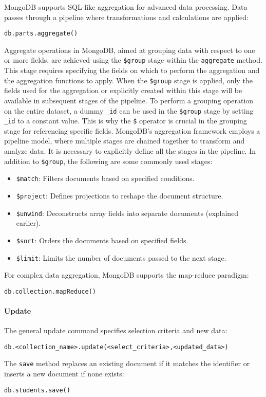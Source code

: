 MongoDB supports SQL-like aggregation for advanced data processing. 
Data passes through a pipeline where transformations and calculations are applied:
\begin{lstlisting}[style=MongoDB]
db.parts.aggregate()
\end{lstlisting}
Aggregate operations in MongoDB, aimed at grouping data with respect to one or more fields, are achieved using the \texttt{\$group} stage within the \texttt{aggregate} method.
This stage requires specifying the fields on which to perform the aggregation and the aggregation functions to apply. 
When the \texttt{\$group} stage is applied, only the fields used for the aggregation or explicitly created within this stage will be available in subsequent stages of the pipeline. 
To perform a grouping operation on the entire dataset, a dummy \texttt{\_id} can be used in the \texttt{\$group} stage by setting \texttt{\_id} to a constant value. 
This is why the \texttt{\$} operator is crucial in the grouping stage for referencing specific fields.
MongoDB's aggregation framework employs a pipeline model, where multiple stages are chained together to transform and analyze data. 
It is necessary to explicitly define all the stages in the pipeline. 
In addition to \texttt{\$group}, the following are some commonly used stages:
\begin{itemize}
    \item \texttt{\$match}: Filters documents based on specified conditions.
    \item \texttt{\$project}: Defines projections to reshape the document structure.
    \item \texttt{\$unwind}: Deconstructs array fields into separate documents (explained earlier).
    \item \texttt{\$sort}: Orders the documents based on specified fields.
    \item \texttt{\$limit}: Limits the number of documents passed to the next stage.
\end{itemize}
\noindent For complex data aggregation, MongoDB supports the map-reduce paradigm:
\begin{lstlisting}[style=MongoDB]
db.collection.mapReduce()
\end{lstlisting}

\paragraph*{Update}
The general update command specifies selection criteria and new data:
\begin{lstlisting}[style=MongoDB]
db.<collection_name>.update(<select_criteria>,<updated_data>)
\end{lstlisting}
The \texttt{save} method replaces an existing document if it matches the identifier or inserts a new document if none exists:
\begin{lstlisting}[style=MongoDB]
db.students.save()
\end{lstlisting}

